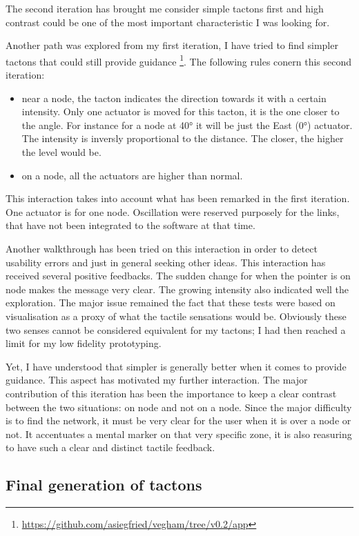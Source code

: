 The second iteration has brought me consider simple tactons first and
high contrast could be one of the most important characteristic I was
looking for.

Another path was explored from my first iteration, I have tried to find
simpler tactons that could still provide guidance \footnote{\url{https://github.com/asiegfried/vegham/tree/v0.2/app}}.
The following rules conern this second iteration:

\begin{itemize}
\item
  near a node, the tacton indicates the direction towards it with a
  certain intensity. Only one actuator is moved for this tacton, it is
  the one closer to the angle. For instance for a node at 40° it will be
  just the East (0°) actuator. The intensity is inversly proportional to
  the distance. The closer, the higher the level would be.
\item
  on a node, all the actuators are higher than normal.
\end{itemize}

This interaction takes into account what has been remarked in the first
iteration. One actuator is for one node. Oscillation were reserved
purposely for the links, that have not been integrated to the software
at that time.

Another walkthrough has been tried on this interaction in order to
detect usability errors and just in general seeking other ideas. This
interaction has received several positive feedbacks. The sudden change
for when the pointer is on node makes the message very clear. The
growing intensity also indicated well the exploration. The major issue
remained the fact that these tests were based on visualisation as a
proxy of what the tactile sensations would be. Obviously these two
senses cannot be considered equivalent for my tactons; I had then
reached a limit for my low fidelity prototyping.

Yet, I have understood that simpler is generally better when it comes to
provide guidance. This aspect has motivated my further interaction. The
major contribution of this iteration has been the importance to keep a
clear contrast between the two situations: on node and not on a node.
Since the major difficulty is to find the network, it must be very clear
for the user when it is over a node or not. It accentuates a mental
marker on that very specific zone, it is also reasuring to have such a
clear and distinct tactile feedback.

\subsection{Final generation of
tactons}\label{final-generation-of-tactons}

